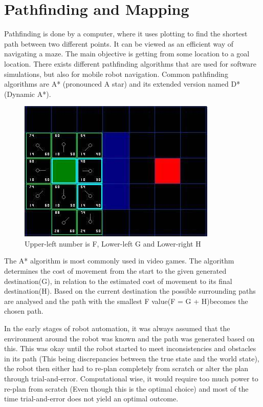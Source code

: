 \clearpage
\section{Pathfinding and Mapping}

Pathfinding is done by a computer, where it uses plotting to find the shortest path between two different points. It can be viewed as an efficient way of navigating a maze. The main objective is getting from some location to a goal location.
There exists different pathfinding algorithms that are used for software simulations, but also for mobile robot navigation. Common pathfinding algorithms are A* (pronounced A star) and its extended version named D* (Dynamic A*).

\begin{figure}[H]
\centering
\includegraphics[width=.7\linewidth]{images/aStar2.jpg}
\caption{Upper-left number is F, Lower-left G and Lower-right H}
\label{fig:sub2}
\end{figure}

The A* algorithm is most commonly used in video games. The algorithm determines the cost of movement from the start to the given generated destination(G), in relation to the estimated cost of movement to its final destination(H). Based on the current destination the possible surrounding paths are analysed and the path with the smallest F value(F = G + H)becomes the chosen path.\cite{astar}

In the early stages of robot automation, it was always assumed that the environment around the robot was known and the path was generated based on this. This was okay until the robot started to meet inconsistencies and obstacles in its path (This being discrepancies between the true state and the world state), the robot then either had to re-plan completely from scratch or alter the plan through trial-and-error. Computational wise, it would require too much power to re-plan from scratch (Even though this is the optimal choice) and most of the time trial-and-error does not yield an optimal outcome.


